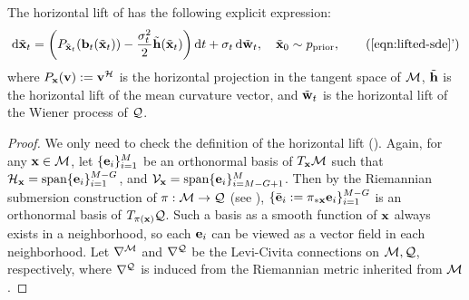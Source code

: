 \begin{theorem**}
    The horizontal lift of  has the following explicit expression:
    \begin{align}
        \dd\bfxxt_t=\left(P_{\bfxxt_t}(\bfbb_t(\bfxxt_t))-\frac{\sigma_t^2}{2}\bfhht(\bfxxt_t)\right)\dd t + \sigma_t \ud \bfwwt_t, \quad \bfxxt_0\sim p_\prior,
        \tag{\ref{eqn:lifted-sde}'}
    \end{align}
    where $P_{\mathbf{x}}(\mathbf{v}) := \mathbf{v}^{\mathcal{H}}$ is the horizontal projection in the tangent space of $\mathcal{M}$, $\tilde{\mathbf{h}}$ is the horizontal lift of the mean curvature vector, and $\tilde{\mathbf{w}}_t$ is the horizontal lift of the Wiener process of $\mathcal{Q}$.
\end{theorem**}
\begin{proof}
    We only need to check the definition of the horizontal lift ().
    Again, for any $\mathbf{x} \in \mathcal{M}$, let $\{\mathbf{e}_i\}_{i=1}^M$ be an orthonormal basis of $T_{\mathbf{x}} \mathcal{M}$ such that $\mathcal{H}_{\mathbf{x}} = \mathrm{span}\{\mathbf{e}_i\}_{i=1}^{M-G}$, and $\mathcal{V}_{\mathbf{x}} = \mathrm{span}\{\mathbf{e}_i\}_{i=M-G+1}^M$. Then by the Riemannian submersion construction of $\pi:\mathcal{M}\to\mathcal{Q}$ (see ), $\{\bar{\mathbf{e}}_i:=\pi_{*\mathbf{x}} \mathbf{e}_i\}_{i=1}^{M-G}$ is an orthonormal basis of $T_{\pi(\mathbf{x})} \mathcal{Q}$. Such a basis as a smooth function of $\mathbf{x}$ always exists in a neighborhood, so each $\mathbf{e}_i$ can be viewed as a vector field in each neighborhood.
    Let $\nabla^{\mathcal{M}}$ and $\nabla^{\mathcal{Q}}$ be the Levi-Civita connections on $\mathcal{M},\mathcal{Q}$, respectively, where $\nabla^{\mathcal{Q}}$ is induced from the Riemannian metric inherited from $\mathcal{M}$.
    

\end{proof}
